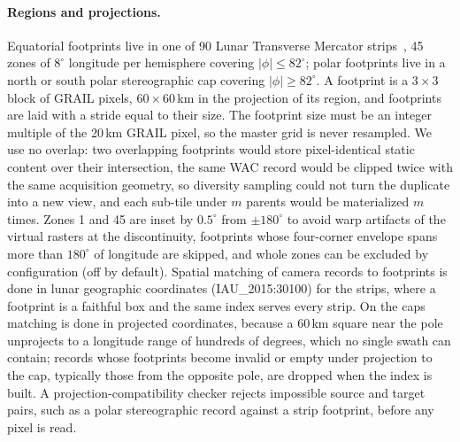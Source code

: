 \paragraph{Regions and projections.} Equatorial footprints live in one of 90 Lunar Transverse Mercator strips~\cite{mcclernan2025lunar}, 45 zones of $8^\circ$ longitude per hemisphere covering $|\phi| \le 82^\circ$; polar footprints live in a north or south polar stereographic cap covering $|\phi| \ge 82^\circ$. A footprint is a $3\times3$ block of GRAIL pixels, $60\times60$\,km in the projection of its region, and footprints are laid with a stride equal to their size. The footprint size must be an integer multiple of the 20\,km GRAIL pixel, so the master grid is never resampled. We use no overlap: two overlapping footprints would store pixel-identical static content over their intersection, the same WAC record would be clipped twice with the same acquisition geometry, so diversity sampling could not turn the duplicate into a new view, and each sub-tile under $m$ parents would be materialized $m$ times. Zones 1 and 45 are inset by $0.5^\circ$ from $\pm180^\circ$ to avoid warp artifacts of the virtual rasters at the discontinuity, footprints whose four-corner envelope spans more than $180^\circ$ of longitude are skipped, and whole zones can be excluded by configuration (off by default). Spatial matching of camera records to footprints is done in lunar geographic coordinates (IAU\_2015:30100) for the strips, where a footprint is a faithful box and the same index serves every strip. On the caps matching is done in projected coordinates, because a 60\,km square near the pole unprojects to a longitude range of hundreds of degrees, which no single swath can contain; records whose footprints become invalid or empty under projection to the cap, typically those from the opposite pole, are dropped when the index is built. A projection-compatibility checker rejects impossible source and target pairs, such as a polar stereographic record against a strip footprint, before any pixel is read.

